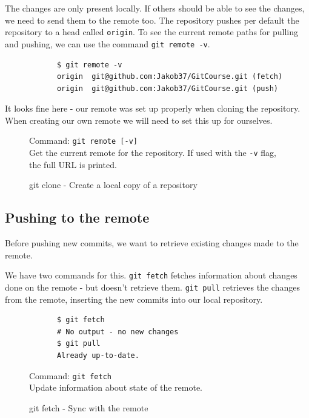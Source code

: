 \documentclass[../main/git_course_main.tex]{subfiles}
\begin{document}
	The changes are only present locally. If others should be able to see the changes, we need to send them to the remote too.
	The repository pushes per default the repository to a head called \verb$origin$. To see the current remote paths for pulling and pushing, we can use the command \verb$git remote -v$.
	
	\begin{codebox}
		\begin{lstlisting}
			$ git remote -v
			origin	git@github.com:Jakob37/GitCourse.git (fetch)
			origin	git@github.com:Jakob37/GitCourse.git (push)
		\end{lstlisting}
	\end{codebox}
	
	It looks fine here - our remote was set up properly when cloning the repository.
	When creating our own remote we will need to set this up for ourselves.
	
	\begin{figure}[h!]
		\begin{bluebox}
			Command: \verb$git remote [-v]$ \\
			
			Get the current remote for the repository. If used with the \verb$-v$ flag,
			the full URL is printed.
		\end{bluebox}
		\label{command:clone}
		\caption{git clone - Create a local copy of a repository}
	\end{figure}
	
	\subsection{Pushing to the remote}
	
	Before pushing new commits, we want to retrieve existing changes made to the remote.
	
	We have two commands for this. \verb$git fetch$ fetches information about changes done on the remote - but doesn't retrieve them.
	\verb$git pull$ retrieves the changes from the remote, inserting the new commits into our local repository.
	
	\begin{codebox}
		\begin{lstlisting}
			$ git fetch
			# No output - no new changes
			$ git pull
			Already up-to-date.
		\end{lstlisting}
	\end{codebox}
	
	\begin{figure}
		\begin{bluebox}
			Command: \verb$git fetch$ \\
			
			Update information about state of the remote.
		\end{bluebox}
		\label{command:fetch}
		\caption{git fetch - Sync with the remote}
	\end{figure}
	
\end{document}
